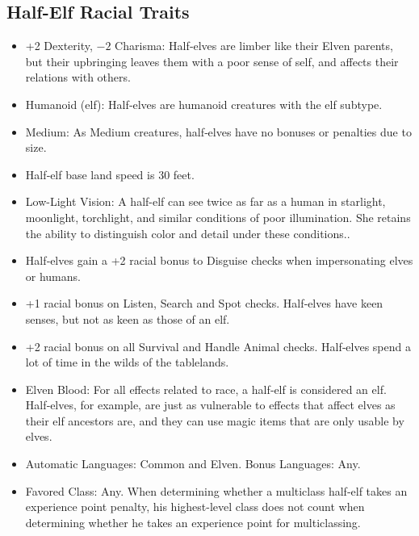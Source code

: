\subsection{Half-Elf Racial Traits}
\begin{itemize}
    \item +2 Dexterity, $-2$ Charisma: Half‐elves are limber like their Elven parents, but their upbringing leaves them with a poor sense of self, and affects their relations with others.
    \item Humanoid (elf): Half‐elves are humanoid creatures with the elf subtype.
    \item Medium: As Medium creatures, half‐elves have no bonuses or penalties due to size.
    \item Half‐elf base land speed is 30 feet.
    \item Low-Light Vision: A half-elf can see twice as far as a human in starlight, moonlight, torchlight, and similar conditions of poor illumination. She retains the ability to distinguish color and detail under these conditions..
    \item Half‐elves gain a +2 racial bonus to Disguise checks when impersonating elves or humans.
    \item +1 racial bonus on Listen, Search and Spot checks. Half‐elves have keen senses, but not as keen as those of an elf.
    \item +2 racial bonus on all Survival and Handle Animal checks. Half‐elves spend a lot of time in the wilds of the tablelands.
    \item Elven Blood: For all effects related to race, a half‐elf is considered an elf. Half‐elves, for example, are just as vulnerable to effects that affect elves as their elf ancestors are, and they can use magic items that are only usable by elves.
    \item Automatic Languages: Common and Elven. Bonus Languages: Any.
    \item Favored Class: Any. When determining whether a multiclass half‐elf takes an experience point penalty, his highest-level class does not count when determining whether he takes an experience point for multiclassing.
\end{itemize}